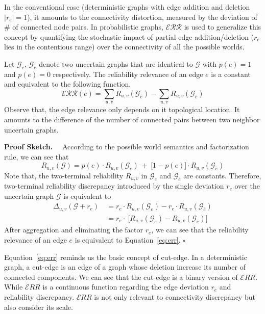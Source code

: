 In the conventional case (deterministic graphs with edge addition and deletion $|r_{e}|=1$), it amounts to the connectivity distortion, measured by the deviation of \# of connected node pairs.  
In probabilistic graphs, $\mathcal{ERR}$ is used to generalize this concept by quantifying the stochastic impact of partial edge addition/deletion ($r_{e}$ lies in the contentious range) over the connectivity of all the possible worlds.
\begin{observation}
  Let $\mathcal{G}_{e}$, $\mathcal{G}_{\bar{e}}$ 
  denote two uncertain graphs that are identical to $\mathcal{G}$ with $p(e)=1$ and $p(e)=0$ respectively. 
  The reliability relevance of an edge $e$ is a constant and equivalent to 
  the following function. 
  \begin{equation}
    \mathcal{ERR}(e) = \sum_{u,v} R_{u,v}(\mathcal{G}_{e}) - \sum_{u,v} R_{u,v}(\mathcal{G}_{\bar{e}})
    \label{eq:err}
  \end{equation}
  Observe that, the edge relevance only depends on it topological location. 
  It amounts to the difference of the number of connected pairs between two neighbor uncertain graphs. 
\end{observation}

\textbf{Proof Sketch.}~~
According to the possible world semantics and factorization rule, we can see that   
\begin{equation*}
  R_{u,v} (\mathcal{G}) = p(e) \cdot R_{u,v}(\mathcal{G}_{e}) ~+~ \big[ 1-p(e) \big] \cdot R_{u,v} (\mathcal{G}_{\bar{e}})
\end{equation*}
Note that, the two-terminal reliability $R_{u,v}$ in $\mathcal{G}_{e}$ and $\mathcal{G}_{\bar{e}}$ are constants. 
Therefore, two-terminal reliability discrepancy introduced by the single deviation $r_{e}$ over the uncertain graph $\mathcal{G}$ is equivalent to 
\begin{equation*}
  \begin{split}
    \Delta_{u,v} (\mathcal{G}+r_{e}) ~&= r_{e} \cdot R_{u,v}(\mathcal{G}_{e}) - r_{e} \cdot R_{u,v} (\mathcal{G}_{\bar{e}})\\
    &= r_{e} \cdot ~\big[  R_{u,v}(\mathcal{G}_{e}) - R_{u,v} (\mathcal{G}_{\bar{e}})  \big]
  \end{split}
\end{equation*}
After aggregation and eliminating the factor $r_{e}$, we can see that the reliability relevance of an edge $e$ is equivalent to Equation~\ref{eq:err}. $\square$

Equation~\ref{eq:err} reminds us the basic concept of cut-edge. 
In a deterministic graph, a cut-edge is an edge of a graph whose deletion increase its number of connected components. 
We can see that the cut-edge is a binary version of $\mathcal{E}RR$.  
While $\mathcal{E}RR$ is a continuous function regarding the edge deviation $r_{e}$ and reliability discrepancy. 
$\mathcal{E}RR$ is not only relevant to connectivity discrepancy but also consider its scale.  


